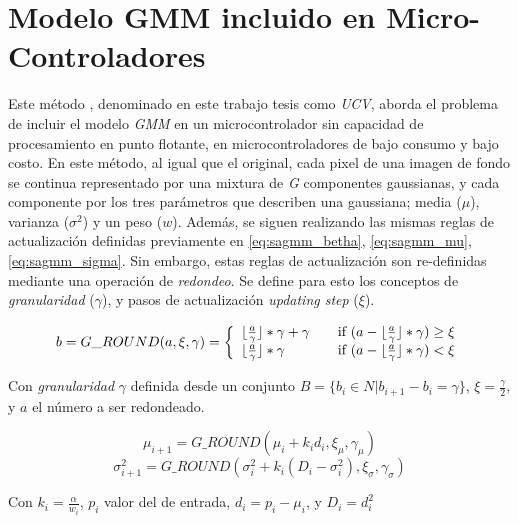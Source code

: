 \section{Modelo GMM incluido en Micro-Controladores}\label{sec:ch3:ucvgmm}
Este método \cite{salvadori_gaussian_2012}, denominado en este trabajo tesis como \textit{UCV}, aborda el problema de incluir el modelo \textit{GMM} en un microcontrolador sin capacidad de procesamiento en punto flotante, en microcontroladores de bajo consumo y bajo costo. En este método, al igual que el original, cada pixel de una imagen de fondo se continua representado por una mixtura de \textit{G} componentes gaussianas, y cada componente por los tres parámetros que describen una gaussiana; media ($\mu$), varianza ($\sigma^2$) y un peso ($w$). Además, se siguen realizando las mismas reglas de actualización definidas previamente en \ref{eq:sagmm_betha}, \ref{eq:sagmm_mu}, \ref{eq:sagmm_sigma}. Sin embargo, estas reglas de actualización son re-definidas mediante una operación de \textit{redondeo}. Se define para esto los conceptos de \textit{granularidad} ($\gamma$), y pasos de actualización \textit{updating step} ($\xi$). 

\begin{equation} \label{eq:ch3:roundfunction}
b=G\_ROUND(a,\xi,\gamma)= \left\{ 
\begin{array}{l l}
\lfloor \frac{a}{\gamma} \rfloor \ast \gamma + \gamma & \quad 
\text{if $(a - \lfloor \frac{a}{\gamma} \rfloor \ast \gamma) \geq \xi$}\\
\lfloor \frac{a}{\gamma} \rfloor \ast \gamma                  & \quad 
\text{if $(a - \lfloor \frac{a}{\gamma} \rfloor \ast \gamma) < \xi$}
\end{array} \right.
\end{equation}

Con \textit{granularidad} $\gamma$ definida desde un conjunto $B=\{ b_i \in N | b_{i+1} - b_i = \gamma\}$, $\xi=\frac{\gamma}{2}$, y $a$ el número a ser redondeado.

\begin{equation}\label{eq:ch3:updating_rule_mu}
\mu_{i+1} = G\_ROUND(\mu_i+k_id_i, \xi_{\mu}, \gamma_{\mu})
\end{equation}
\begin{equation}\label{eq:ch3:updating_rule_sigma}
\sigma^2_{i+1} = G\_ROUND(\sigma^2_i + k_i(D_i-\sigma^2_i), \xi_{\sigma}, \gamma_{\sigma})
\end{equation}

Con $k_i=\frac{\alpha}{w_i}$, $p_i$ valor del de entrada, $d_i=p_i-\mu_i$, y $D_i=d^2_i$

